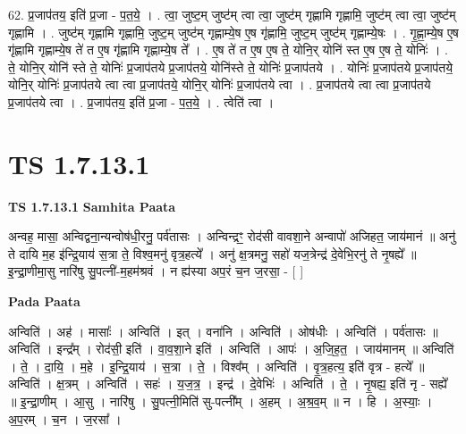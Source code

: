 \documentclass[17pt]{extarticle}
\begin{document}
62. प्र॒जाप॑तय॒ इति॑ प्र॒जा - प॒त॒ये॒ । . त्वा॒ जुष्ट॒म् जुष्ट॑म् त्वा त्वा॒ जुष्ट॑म् गृह्णामि गृह्णामि॒ जुष्ट॑म् त्वा त्वा॒ जुष्ट॑म् गृह्णामि । . जुष्ट॑म् गृह्णामि गृह्णामि॒ जुष्ट॒म् जुष्ट॑म् गृह्णाम्ये॒ष ए॒ष गृ॑ह्णामि॒ जुष्ट॒म् जुष्ट॑म् गृह्णाम्ये॒षः । . गृ॒ह्णा॒म्ये॒ष ए॒ष गृ॑ह्णामि गृह्णाम्ये॒ष ते॑ त ए॒ष गृ॑ह्णामि गृह्णाम्ये॒ष ते᳚ । . ए॒ष ते॑ त ए॒ष ए॒ष ते॒ योनि॒र् योनि॑ स्त ए॒ष ए॒ष ते॒ योनिः॑ । . ते॒ योनि॒र् योनि॑ स्ते ते॒ योनिः॑ प्र॒जाप॑तये प्र॒जाप॑तये॒ योनि॑स्ते ते॒ योनिः॑ प्र॒जाप॑तये । . योनिः॑ प्र॒जाप॑तये प्र॒जाप॑तये॒ योनि॒र् योनिः॑ प्र॒जाप॑तये त्वा त्वा प्र॒जाप॑तये॒ योनि॒र् योनिः॑ प्र॒जाप॑तये त्वा । . प्र॒जाप॑तये त्वा त्वा प्र॒जाप॑तये प्र॒जाप॑तये त्वा । . प्र॒जाप॑तय॒ इति॑ प्र॒जा - प॒त॒ये॒ । . त्वेति॑ त्वा । \newline
\pagebreak
{}
\section*{ TS 1.7.13.1 }

\textbf{TS 1.7.13.1 } \newline
\textbf{Samhita Paata} \newline

अन्वह॒ मासा॒ अन्विद्वना॒न्यन्वोष॑धी॒रनु॒ पर्व॑तासः । अन्विन्द्रꣳ॒॒ रोद॑सी वावशा॒ने अन्वापो॑ अजिहत॒ जाय॑मानं ॥ अनु॑ ते दायि म॒ह इ॑न्द्रि॒याय॑ स॒त्रा ते॒ विश्व॒मनु॑ वृत्र॒हत्ये᳚ । अनु॑ क्ष॒त्रमनु॒ सहो॑ यज॒त्रेन्द्र॑ दे॒वेभि॒रनु॑ ते नृ॒षह्ये᳚ ॥ इ॒न्द्रा॒णीमा॒सु नारि॑षु सु॒पत्नी॑-म॒हम॑श्रवं । न ह्य॑स्या अप॒रं च॒न ज॒रसा॒ - [ ] \newline

\textbf{Pada Paata} \newline

अन्विति॑ । अह॑ । मासाः᳚ । अन्विति॑ । इत् । वना॑नि । अन्विति॑ । ओष॑धीः । अन्विति॑ । पर्व॑तासः ॥ अन्विति॑ । इन्द्र᳚म् । रोद॑सी॒ इति॑ । वा॒व॒शा॒ने इति॑ । अन्विति॑ । आपः॑ । अ॒जि॒ह॒त॒ । जाय॑मानम् ॥ अन्विति॑ । ते॒ । दा॒यि॒ । म॒हे । इ॒न्द्रि॒याय॑ । स॒त्रा । ते॒ । विश्व᳚म् । अन्विति॑ । वृ॒त्र॒हत्य॒ इति॑ वृत्र - हत्ये᳚ ॥ अन्विति॑ । क्ष॒त्रम् । अन्विति॑ । सहः॑ । य॒ज॒त्र॒ । इन्द्र॑ । दे॒वेभिः॑ । अन्विति॑ । ते॒ । नृ॒षह्य॒ इति॑ नृ - सह्ये᳚ ॥ इ॒न्द्रा॒णीम् । आ॒सु । नारि॑षु । सु॒पत्नी॒मिति॑ सु-पत्नी᳚म् । अ॒हम् । अ॒श्र॒व॒म् ॥ न । हि । अ॒स्याः॒ । अ॒प॒रम् । च॒न । ज॒रसा᳚ ।  \newline
\end{document}
